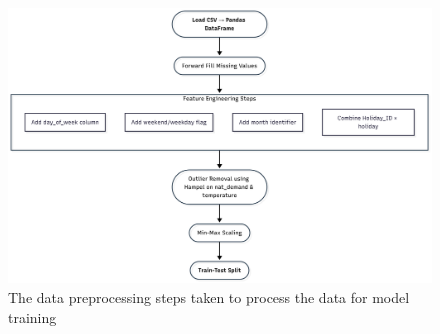 \appendix 
\label{sec:appendixA}
\begin{figure}[htbp]
	\centering %
	\includegraphics[scale=0.1]{Chapters/images/preprocess.png}
	\caption{The data preprocessing steps taken to process the data for model training}
	\label{fig:preprocessing_steps_flowchart} %
\end{figure}


